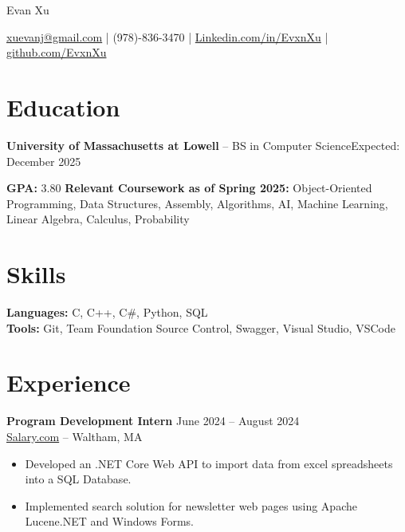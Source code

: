 \documentclass[11pt]{article}       %
\begin{document}
\centerline{\Huge Evan Xu}

\vspace{5pt}

\centerline{\href{mailto:xuevanj@gmail.com}{xuevanj@gmail.com} | (978)-836-3470 | \href{Linkedin.com/in/EvxnXu}{Linkedin.com/in/EvxnXu} | \href{github.com/EvxnXu}{github.com/EvxnXu}}

\vspace{-10pt}

\section*{Education}
\textbf{University of Massachusetts at Lowell} -- BS in Computer Science\hfill Expected: December 2025

\textbf{GPA:} 3.80 \newline \newline
\textbf{Relevant Coursework as of Spring 2025:} Object-Oriented Programming, Data Structures, Assembly, Algorithms, AI, Machine Learning, Linear Algebra, Calculus, Probability \\


\vspace{-9pt}

\section*{Skills}
\textbf{Languages:} C, C++, C\#, Python, SQL\\
\textbf{Tools:} Git, Team Foundation Source Control, Swagger, Visual Studio, VSCode

\vspace{-9pt}

\section*{Experience}

\textbf{Program Development Intern}  \hfill June 2024 -- August 2024 \\
\href{https://www.salary.com/}{Salary.com} -- Waltham, MA \\
\vspace{-9pt}
\begin{itemize}
  \item Developed an .NET Core Web API to import data from excel spreadsheets into a SQL Database.
  \item  Implemented search solution for newsletter web pages using Apache Lucene.NET and Windows Forms.
\end{itemize}
\end{document}
